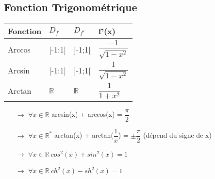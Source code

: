 \subsection{Fonction Trigonométrique}
\begin{center}
\begin{tabular}{|l|l|l|l|}
\hline
Fonction & $D_f$ & $D_{f'}$ & f'(x) \\ \hline
Arccos & [-1:1] & ]-1;1[ & $\dfrac{-1}{\sqrt{1-x^2}}$ \\  \hline
Arcsin & [-1:1] & ]-1;1[ & $\dfrac{1}{\sqrt{1-x^2}}$ \\ \hline
Arctan & $\mathbb{R}$ & $\mathbb{R}$ & $\dfrac{1}{1+x^2}$ \\ \hline
\end{tabular}
\end{center}
\begin{itemize}
 \item[{$\rightarrow$}] $\forall x \in \mathbb{R}$ arcsin(x) + arccos(x) = $\dfrac{\pi}{2}$\\
 \item[{$\rightarrow$}] $\forall x \in \mathbb{R}^*$ arctan(x) + arctan($\dfrac{1}{x}$) = $\pm\dfrac{\pi}{2}$ (dépend du signe de x)\\
 \item[{$\rightarrow$}] $\forall x \in \mathbb{R}~ cos^2(x)+sin^2(x) = 1$\\
 \item[{$\rightarrow$}] $\forall x \in \mathbb{R}~ ch^2(x) - sh^2(x) = 1$
\end{itemize}

